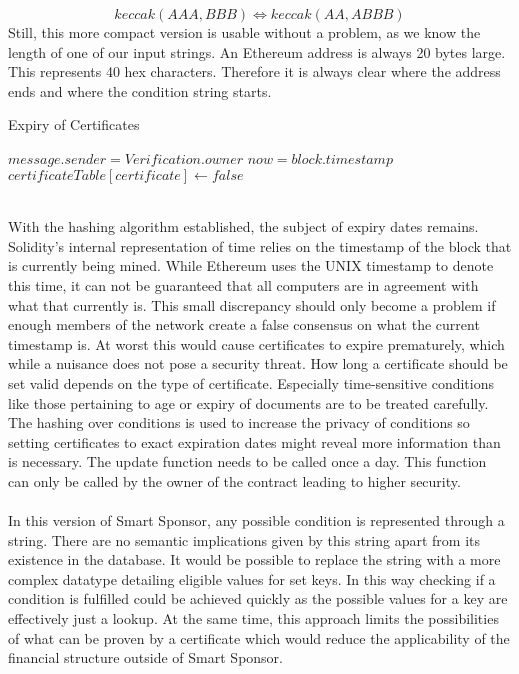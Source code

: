 \begin{equation*}
    keccak(AAA, BBB) \Longleftrightarrow keccak(AA, ABBB)
\end{equation*}
Still, this more compact version is usable without a problem, as we know the length of one of our input strings. An Ethereum address is always 20 bytes large. This represents 40 hex characters. Therefore it is always clear where the address ends and where the condition string starts.\\
\begin{algorithm}
\caption{Expiry of Certificates}\label{alg:update}
\begin{algorithmic}
\Require $message.sender = Verification.owner$
\State $now = block.timestamp$
\State $certificateTable[certificate] \gets false$
\EndIf
\EndFor
\end{algorithmic}
\end{algorithm}
\\
With the hashing algorithm established, the subject of expiry dates remains. Solidity's internal representation of time relies on the timestamp of the block that is currently being mined. While Ethereum uses the UNIX timestamp to denote this time, it can not be guaranteed that all computers are in agreement with what that currently is. This small discrepancy should only become a problem if enough members of the network create a false consensus on what the current timestamp is. At worst this would cause certificates to expire prematurely, which while a nuisance does not pose a security threat. How long a certificate should be set valid depends on the type of certificate. Especially time-sensitive conditions like those pertaining to age or expiry of documents are to be treated carefully. The hashing over conditions is used to increase the privacy of conditions so setting certificates to exact expiration dates might reveal more information than is necessary. The update function needs to be called once a day. This function can only be called by the owner of the contract leading to higher security.\\
\\
In this version of Smart Sponsor, any possible condition is represented through a string. There are no semantic implications given by this string apart from its existence in the database. It would be possible to replace the string with a more complex datatype detailing eligible values for set keys. In this way checking if a condition is fulfilled could be achieved quickly as the possible values for a key are effectively just a lookup. At the same time, this approach limits the possibilities of what can be proven by a certificate which would reduce the applicability of the financial structure outside of Smart Sponsor.\\ 
